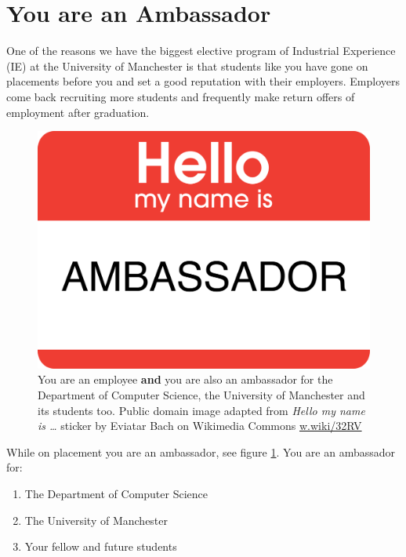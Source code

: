 \documentclass[
]{book}
\providecommand{\tightlist}{%
  \setlength{\itemsep}{0pt}\setlength{\parskip}{0pt}}
\begin{document}
\section{You are an Ambassador}\label{ambassador}

One of the reasons we have the biggest elective program of Industrial Experience (IE) at the University of Manchester is that students like you have gone on placements before you and set a good reputation with their employers. Employers come back recruiting more students and frequently make return offers of employment after graduation.

\begin{figure}

{\centering \includegraphics[width=0.8\linewidth]{images/ambassador} 

}

\caption{You are an employee \textbf{and} you are also an ambassador for the Department of Computer Science, the University of Manchester and its students too. Public domain image adapted from \emph{Hello my name is \ldots{}} sticker by Eviatar Bach on Wikimedia Commons \href{https://w.wiki/32RV}{w.wiki/32RV}}\label{fig:ambassador-fig}
\end{figure}



While on placement you are an ambassador, see figure \ref{fig:ambassador-fig}. You are an ambassador for:

\begin{enumerate}
\def\labelenumi{\arabic{enumi}.}
\tightlist
\item
  The Department of Computer Science
\item
  The University of Manchester
\item
  Your fellow and future students
\end{enumerate}
\end{document}
